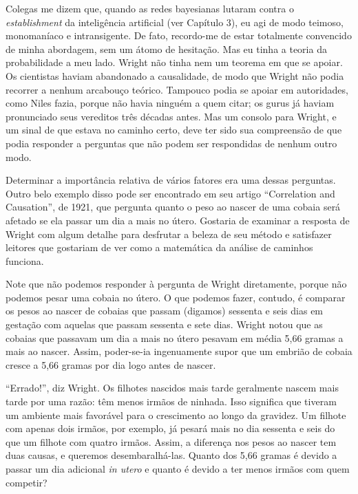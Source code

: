\documentclass[11pt,a5paper,twoside]{book}
\begin{document}
Colegas me dizem que, quando as redes bayesianas lutaram contra o \textit{establishment} da inteligência artificial (ver Capítulo 3), eu agi de modo teimoso, monomaníaco e intransigente. De fato, recordo-me de estar totalmente convencido de minha abordagem, sem um átomo de hesitação. Mas eu tinha a teoria da probabilidade a meu lado. Wright não tinha nem um teorema em que se apoiar. Os cientistas haviam abandonado a causalidade, de modo que Wright não podia recorrer a nenhum arcabouço teórico. Tampouco podia se apoiar em autoridades, como Niles fazia, porque não havia ninguém a quem citar; os gurus já haviam pronunciado seus vereditos três décadas antes. Mas um consolo para Wright, e um sinal de que estava no caminho certo, deve ter sido sua compreensão de que podia responder a perguntas que não podem ser respondidas de nenhum outro modo.

Determinar a importância relativa de vários fatores era uma dessas perguntas. Outro belo exemplo disso pode ser encontrado em seu artigo “Correlation and Causation”, de 1921, que pergunta quanto o peso ao nascer de uma cobaia será afetado se ela passar um dia a mais no útero. Gostaria de examinar a resposta de Wright com algum detalhe para desfrutar a beleza de seu método e satisfazer leitores que gostariam de ver como a matemática da análise de caminhos funciona.

Note que não podemos responder à pergunta de Wright diretamente, porque não podemos pesar uma cobaia no útero. O que podemos fazer, contudo, é comparar os pesos ao nascer de cobaias que passam (digamos) sessenta e seis dias em gestação com aquelas que passam sessenta e sete dias. Wright notou que as cobaias que passavam um dia a mais no útero pesavam em média 5,66 gramas a mais ao nascer. Assim, poder-se-ia ingenuamente supor que um embrião de cobaia cresce a 5,66 gramas por dia logo antes de nascer.

“Errado!”, diz Wright. Os filhotes nascidos mais tarde geralmente nascem mais tarde por uma razão: têm menos irmãos de ninhada. Isso significa que tiveram um ambiente mais favorável para o crescimento ao longo da gravidez. Um filhote com apenas dois irmãos, por exemplo, já pesará mais no dia sessenta e seis do que um filhote com quatro irmãos. Assim, a diferença nos pesos ao nascer tem duas causas, e queremos desembaralhá-las. Quanto dos 5,66 gramas é devido a passar um dia adicional \textit{in utero} e quanto é devido a ter menos irmãos com quem competir?
\end{document}
